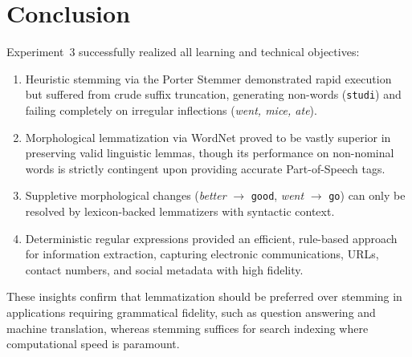 \section{Conclusion}
Experiment~3 successfully realized all learning and technical objectives:
\begin{enumerate}
    \item Heuristic stemming via the Porter Stemmer demonstrated rapid execution but suffered from crude suffix truncation, generating non-words (\texttt{studi}) and failing completely on irregular inflections (\textit{went, mice, ate}).
    \item Morphological lemmatization via WordNet proved to be vastly superior in preserving valid linguistic lemmas, though its performance on non-nominal words is strictly contingent upon providing accurate Part-of-Speech tags.
    \item Suppletive morphological changes (\textit{better} $\to$ \texttt{good}, \textit{went} $\to$ \texttt{go}) can only be resolved by lexicon-backed lemmatizers with syntactic context.
    \item Deterministic regular expressions provided an efficient, rule-based approach for information extraction, capturing electronic communications, URLs, contact numbers, and social metadata with high fidelity.
\end{enumerate}
These insights confirm that lemmatization should be preferred over stemming in applications requiring grammatical fidelity, such as question answering and machine translation, whereas stemming suffices for search indexing where computational speed is paramount.
